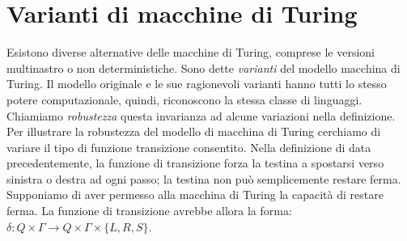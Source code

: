 \documentclass[12pt]{report}
\newcommand{\namerefl}[1]{%
	\bgroup
	\let\nmu\MakeLowercase
	\nameref{#1}\egroup}
\newcommand{\nmu}{}
\begin{document}
\section{Varianti di macchine di Turing}
Esistono diverse alternative delle macchine di Turing, comprese le versioni multinastro o non deterministiche. Sono dette \textit{varianti} del modello macchina di Turing. Il modello originale e le sue ragionevoli varianti hanno tutti lo stesso potere computazionale, quindi, riconoscono la stessa classe di linguaggi. Chiamiamo \textit{robustezza} questa invarianza ad alcune variazioni nella definizione. Per illustrare la robustezza del modello di macchina di Turing cerchiamo di variare il tipo di funzione transizione consentito. Nella definizione di \namerefl{def:mdt} data precedentemente, la funzione di transizione forza la testina a spostarsi verso sinistra o destra ad ogni passo; la testina non può semplicemente restare ferma. Supponiamo di aver permesso alla macchina di Turing la capacità di restare ferma. La funzione di transizione avrebbe allora la forma: $\delta: Q \times \Gamma \to Q \times \Gamma \times \{L, R, S\}$.
\end{document}
